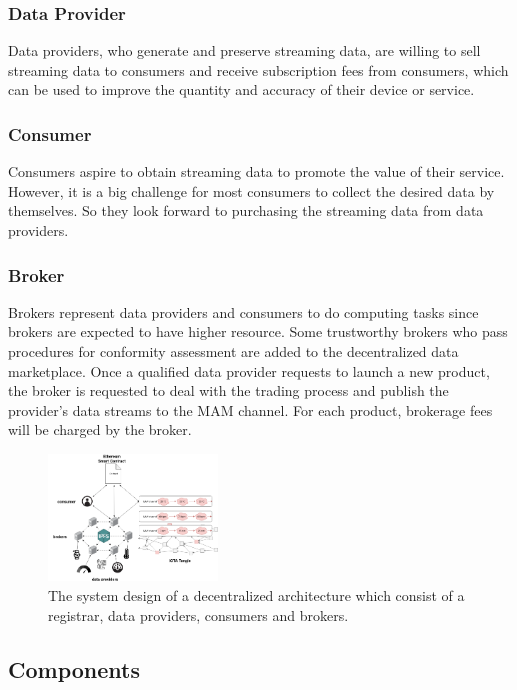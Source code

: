 \documentclass[journal,10pt,a4paper]{IEEEtran}
\begin{document}
\subsubsection{Data Provider}
Data providers, who generate and preserve streaming data, are willing to sell streaming data to consumers and receive subscription fees from consumers, which can be used to improve the quantity and accuracy of their device or service.

\subsubsection{Consumer}
Consumers aspire to obtain streaming data to promote the value of their service. However, it is a big challenge for most consumers to collect the desired data by themselves. So they look forward to purchasing the streaming data from data providers.

\subsubsection{Broker}
Brokers represent data providers and consumers to do computing tasks since brokers are expected to have higher resource. Some trustworthy brokers who pass procedures for conformity assessment are added to the decentralized data marketplace. Once a qualified data provider requests to launch a new product, the broker is requested to deal with the trading process and publish the provider’s data streams to the MAM channel. For each product, brokerage fees will be charged by the broker.

\begin{figure}[h]
    \centering
    \includegraphics[width=0.4\textwidth]{system_design}
    \caption{The system design of a decentralized architecture which consist of a registrar, data providers, consumers and brokers.}
    \label{fig:system_design}
\end{figure}

\subsection{Components}
\end{document}

